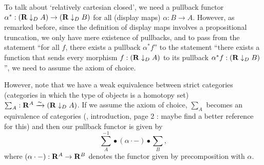 \begin{remark}
  To talk about `relatively cartesian closed', we need a pullback functor $ \alpha^* : (\mathbf{R} \downarrow_D A) \to (\mathbf{R} \downarrow_D B) $ for all (display maps) $ \alpha: B \to A $. However, as remarked before, since the definition of display maps involves a propositional truncation, we only have mere existence of pullbacks, and to pass from the statement ``for all $ f $, there exists a pullback $ \alpha^* f $'' to the statement ``there exists a function that sends every morphism $ f : (\mathbf{R} \downarrow_D A) $ to its pullback $ \alpha^* f : (\mathbf{R} \downarrow_D B) $'', we need to assume the axiom of choice.

  However, note that we have a weak equivalence between strict categories (categories in which the type of objects is a homotopy set) $ \sum_A: \mathbf{R}^A \xrightarrow \sim (\mathbf{R} \downarrow_D A) $. If we assume the axiom of choice, $ \sum_A $ becomes an equivalence of categories (\cite{univalent-categories}, introduction, page 2 \TODO: maybe find a better reference for this) and then our pullback functor is given by
  \[ \sum_A^{-1} \bullet (\alpha \cdot -) \bullet \sum_B, \]
  where $ (\alpha \cdot -): \mathbf{R}^A \to \mathbf{R}^B $ denotes the functor given by precomposition with $ \alpha $.
\end{remark}

